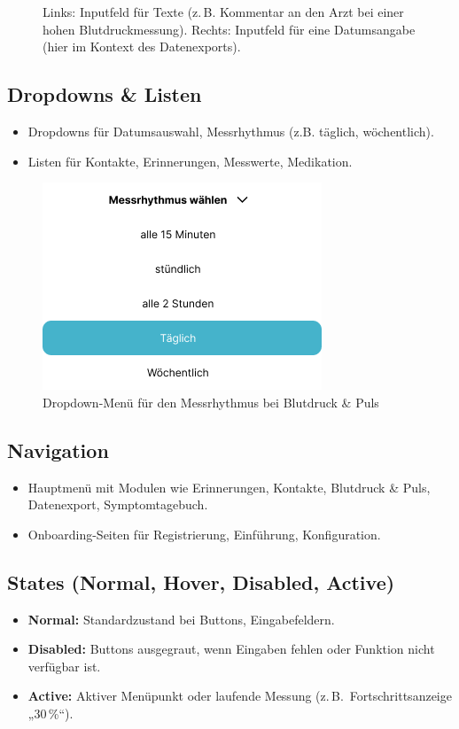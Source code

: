 \begin{figure}[h!]
	\vspace{-2.5em} %
	\caption{Links: Inputfeld für Texte (z.\,B. Kommentar an den Arzt bei einer hohen Blutdruckmessung). 
		Rechts: Inputfeld für eine Datumsangabe (hier im Kontext des Datenexports).}
	\label{fig:input-und-datum}
\end{figure}



\newpage

\subsection{Dropdowns \& Listen}
\begin{itemize}
	\item Dropdowns für Datumsauswahl, Messrhythmus (z.B. täglich, wöchentlich).
	\item Listen für Kontakte, Erinnerungen, Messwerte, Medikation.
\end{itemize}

\begin{figure}[!h]
	\centering
	\includegraphics[width=0.45\linewidth]{images/Dropdown}
	\caption{Dropdown-Menü für den Messrhythmus bei Blutdruck \& Puls}
	\label{fig:dropdown}
\end{figure}

\subsection{Navigation}
\begin{itemize}
	\item Hauptmenü mit Modulen wie Erinnerungen, Kontakte, Blutdruck \& Puls, Datenexport, Symptomtagebuch.
	\item Onboarding-Seiten für Registrierung, Einführung, Konfiguration.
\end{itemize}

\subsection{States (Normal, Hover, Disabled, Active)}
\begin{itemize}
	\item \textbf{Normal:} Standardzustand bei Buttons, Eingabefeldern.
	\item \textbf{Disabled:} Buttons ausgegraut, wenn Eingaben fehlen oder Funktion nicht verfügbar ist.
	\item \textbf{Active:} Aktiver Menüpunkt oder laufende Messung (z.\,B.\ Fortschrittsanzeige „30\,\%“).
\end{itemize}

